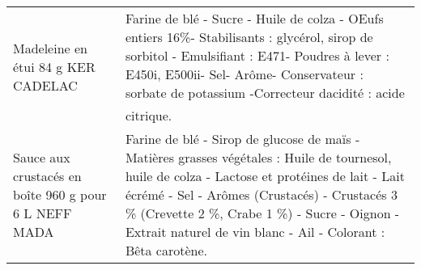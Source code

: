 \begin{longtable}{p{5cm}p{10cm}}
                                                                       Madeleine en étui 84 g KER CADELAC &                                                                                                                                                                                                                                                                                                                                                                                                                                                                                                                                                                                                                                                                                                                                                                                    Farine de blé - Sucre - Huile de colza - OEufs entiers 16\%- Stabilisants : glycérol, sirop de sorbitol - Emulsifiant : E471- Poudres à lever : E450i, E500ii- Sel- Arôme- Conservateur : sorbate de potassium -Correcteur dacidité : acide citrique. \\
                                                    Sauce aux crustacés en boîte 960 g pour 6 L NEFF MADA &                                                                                                                                                                                                                                                                                                                                                                                                                                                                                                                                                                                                                                                                                                                           Farine de blé - Sirop de glucose de maïs - Matières grasses végétales : Huile de tournesol, huile de colza - Lactose et protéines de lait - Lait écrémé - Sel - Arômes (Crustacés) - Crustacés 3 \% (Crevette 2 \%, Crabe 1 \%) - Sucre - Oignon - Extrait naturel de vin blanc - Ail - Colorant : Bêta carotène. \\

\end{longtable}

